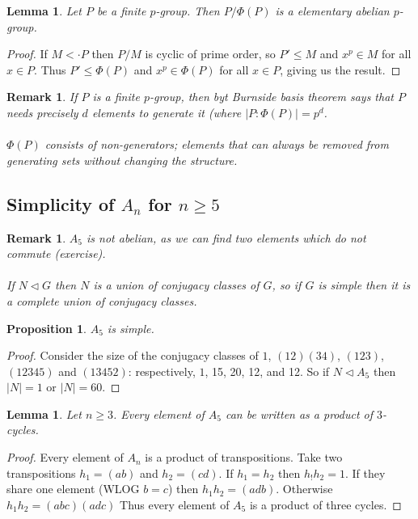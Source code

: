 \documentclass[a4paper,10pt]{article}
\newtheorem{prop}[thm]{Proposition}
\newtheorem{Lem}[thm]{Lemma}
\newtheorem{rem}[thm]{Remark}
\begin{document}
\begin{Lem}
Let $P$ be a finite $p$-group. Then $P / \Phi(P)$ is a elementary abelian $p$-group. 
\end{Lem}

\begin{proof}
If $M < \cdot P$ then $P / M$ is cyclic of prime order, so $P' \leq M$ and $x^p \in M$ for all $x \in P$. Thus $P' \leq \Phi(P)$ and $x^p \in \Phi(P)$ for all $x \in P$, giving us the result. 
\end{proof}

\begin{rem}
If $P$ is a finite $p$-group, then byt Burnside basis theorem says that $P$ needs precisely $d$ elements to generate it (where $|P : \Phi(P)| = p^d$. \\
\\
$\Phi(P)$ consists of non-generators; elements that can always be removed from generating sets without changing the structure.
\end{rem}

\subsection{Simplicity of $A_n$ for $n \geq 5$}

\begin{rem}
$A_5$ is not abelian, as we can find two elements which do not commute (exercise). \\
\\
If $N \triangleleft G$ then $N$ is a union of conjugacy classes of $G$, so if $G$ is simple then it is a complete union of conjugacy classes.
\end{rem}

\begin{prop}
$A_5$ is simple.
\end{prop}

\begin{proof}
Consider the size of the conjugacy classes of $1$, $(12)(34)$, $(123)$, $(12345)$ and $(13452)$: respectively, $1$, 15, 20, 12, and 12.
So if $N \triangleleft A_5$ then $|N| = 1$ or $|N| = 60$. 
\end{proof}

\begin{Lem}
Let $n \geq 3$. Every element of $A_5$ can be written as a product of $3$-cycles.
\end{Lem}

\begin{proof}
Every element of $A_n$ is a product of transpositions. Take two transpositions $h_1 = (ab)$ and $h_2 = (cd)$. If $h_1 = h_2$ then $h_!h_2 = 1$. If they share one element (WLOG $b=c$) then $h_1h_2 = (adb)$. Otherwise $h_1h_2 = (abc)(adc)$ Thus every element of $A_5$ is a product of three cycles. 
\end{proof}
\end{document}
